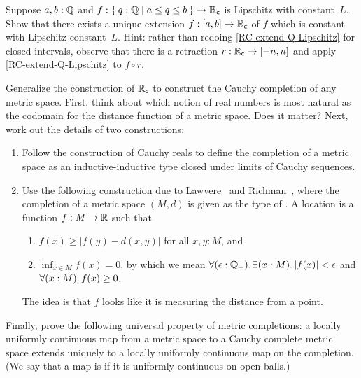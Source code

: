 \begin{ex} \label{RC-Lipschitz-on-interval} Suppose $a, b : \mathbb{Q}$ and $f : \setof{ q : \Q |
    a \leq q \leq b } \to \RC$ is Lipschitz with constant~$L$. Show that there exists a unique
  extension $\bar{f} : [a,b] \to \mathbb{R}_\mathsf{c}$ of $f$ which is constant with Lipschitz
  constant~$L$. Hint: rather than redoing \autoref{RC-extend-Q-Lipschitz} for closed
  intervals, observe that there is a retraction $r : \mathbb{R}_\mathsf{c} \to [-n,n]$ and apply
  \autoref{RC-extend-Q-Lipschitz} to $f \circ r$.
\end{ex}

\begin{ex} \label{ex:metric-completion}
  Generalize the construction of $\mathbb{R}_\mathsf{c}$ to construct the Cauchy completion of any metric space. First, think about which notion of real numbers is most natural as the codomain for the distance function of a metric space. Does it matter? Next, work out the details of two constructions:
  \begin{enumerate}
  \item Follow the construction of Cauchy reals to define the completion of a metric space as an inductive-inductive type closed under limits of Cauchy sequences.
  \item Use the following construction due to Lawvere~\cite{lawvere:metric-spaces} and Richman~\cite{Richman00thefundamental}, where the completion of a metric space $(M, d)$ is given as the type of .
    A location is a function $f : M \to \mathbb{R}$ such that
    \begin{enumerate}
    \item $f(x) \geq |f(y) - d(x,y)|$ for all $x, y : M$, and
    \item $\inf_{x \in M} f(x) = 0$, by which we mean $\fall{\epsilon : \Qp} \exis{x : M} |f(x)| < \epsilon$ and $\fall{x : M} f(x) \geq 0$.
    \end{enumerate}
    The idea is that $f$ looks like it is measuring the distance from a point.
  \end{enumerate}
  Finally, prove the following universal property of metric completions: a locally uniformly continuous map from a metric space to a Cauchy complete metric space extends uniquely to a locally uniformly continuous map on the completion. (We say that a map is 
  if it is uniformly continuous on open balls.)
\end{ex}

